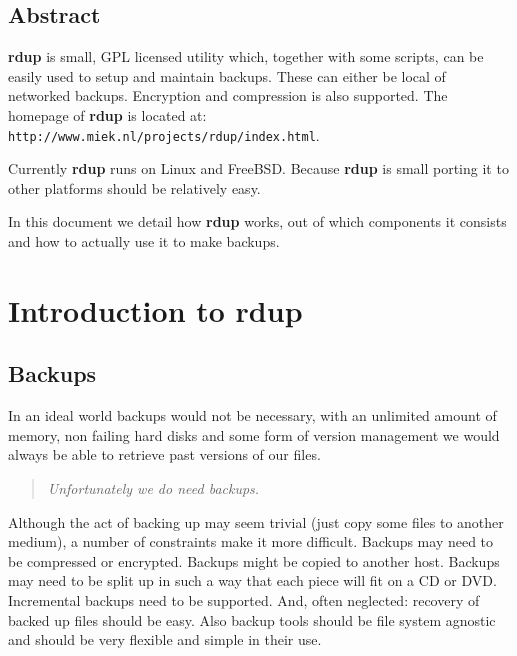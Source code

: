 \documentclass[a4paper, openany]{memoir}
\newcommand{\rdup}{\textbf{rdup}}
\newcommand{\url}[1]{\texttt{#1}}
\begin{document}
\section*{Abstract}
\rdup{} is small, GPL licensed utility which, together with some scripts, can
be easily used to setup and maintain backups. These can either be local
of networked backups. Encryption and compression is also supported.
The homepage of \rdup{} is located at: \\
\url{http://www.miek.nl/projects/rdup/index.html}.

Currently \rdup{} runs on Linux and FreeBSD. Because \rdup{} is
small porting it to other platforms should be relatively easy.

In this document we detail how \rdup{} works, out of which components
it consists and how to actually use it to make backups.

\tableofcontents

\chapter{Introduction to \rdup}

\section{Backups}
In an ideal world backups would not be necessary, with an un\-limited
amount of memory, non failing hard disks and some form of version
management we would always be able to retrieve past versions of our files.
\begin{quote}
\emph{Unfortunately we do need backups.}
\end{quote}
Although the act of backing up may seem trivial (just copy some files
to another medium), a number of constraints make it more difficult. 
Backups may need to be compressed or encrypted. Backups might be copied
to another host. Backups may need to be split up in such a way that
each piece will fit on a CD or DVD. Incremental backups need to be
supported. And, often neglected: recovery of backed up
files should be easy.  Also backup tools should be file system agnostic
and should be very flexible and simple in their use.
\end{document}
